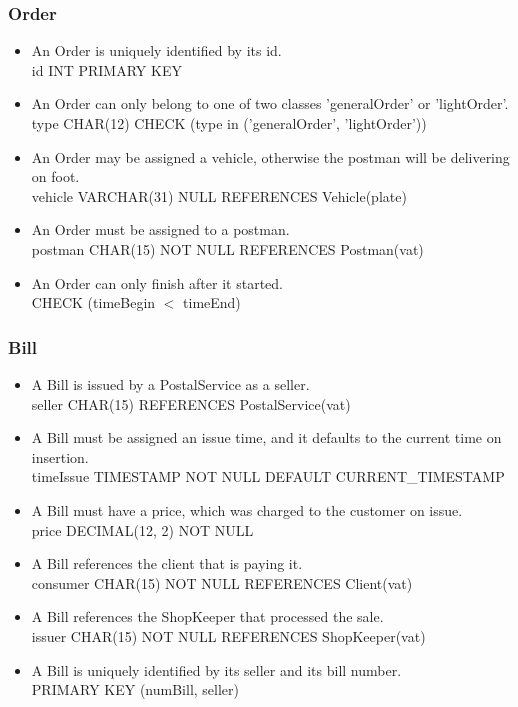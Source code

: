 \documentclass{report}[a4paper]
\theoremstyle{remark}
\begin{document}
\subsubsection{Order}
\begin{itemize}
    \item An Order is uniquely identified by its id. \\ id INT PRIMARY KEY
    \item An Order can only belong to one of two classes 'generalOrder' or 'lightOrder'. \\ type CHAR(12) CHECK (type in ('generalOrder', 'lightOrder'))
    \item An Order may be assigned a vehicle, otherwise the postman will be delivering on foot. \\ vehicle VARCHAR(31) NULL REFERENCES Vehicle(plate)
    \item An Order must be assigned to a postman. \\ postman CHAR(15) NOT NULL REFERENCES Postman(vat)
    \item An Order can only finish after it started. \\ CHECK (timeBegin $<$ timeEnd)
\end{itemize}
\subsubsection{Bill}
\begin{itemize}
    \item A Bill is issued by a PostalService as a seller. \\ seller CHAR(15) REFERENCES PostalService(vat)
    \item A Bill must be assigned an issue time, and it defaults to the current time on insertion. \\ timeIssue TIMESTAMP NOT NULL DEFAULT CURRENT\_TIMESTAMP
    \item A Bill must have a price, which was charged to the customer on issue. \\ price DECIMAL(12, 2) NOT NULL
    \item A Bill references the client that is paying it. \\ consumer CHAR(15) NOT NULL REFERENCES Client(vat)
    \item A Bill references the ShopKeeper that processed the sale. \\ issuer CHAR(15) NOT NULL REFERENCES ShopKeeper(vat)
    \item A Bill is uniquely identified by its seller and its bill number. \\ PRIMARY KEY (numBill, seller)
\end{itemize}
\end{document}
